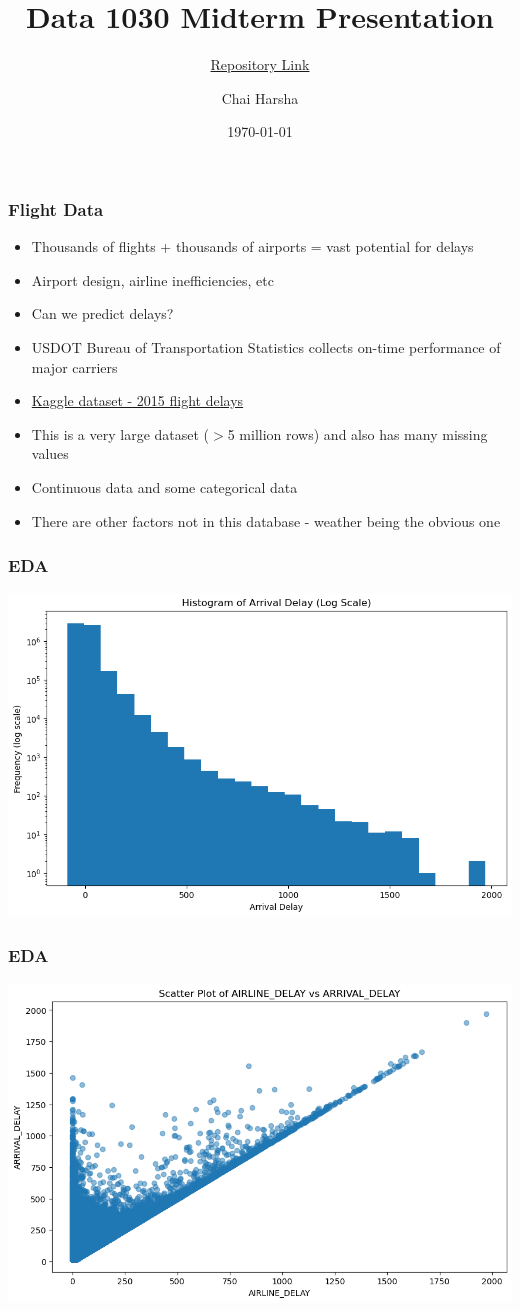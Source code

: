 \documentclass[
    aspectratio = 169,
    ]{beamer}
\title{Data 1030 Midterm Presentation}
\subtitle{\href{https://github.com/Equite774/data1030-final-project-Equite774}{Repository Link}}
\author{Chai Harsha}
\institute{Brown University}
\date{\today}
\begin{document}
\begin{frame}
    \titlepage
\end{frame}

\begin{frame}
    \frametitle{Flight Data}
    \begin{itemize}
        \item Thousands of flights + thousands of airports = vast potential for delays
        \item Airport design, airline inefficiencies, etc
        \item Can we predict delays?
        \item USDOT Bureau of Transportation Statistics collects on-time performance of major carriers
        \item \href{https://www.kaggle.com/datasets/usdot/flight-delays/data?select=flights.csv}{\color{blue}Kaggle dataset - 2015 flight delays\color{black}}
        \item This is a very large dataset (\(>\)5 million rows) and also has many missing values
        \item Continuous data and some categorical data
        \item There are other factors not in this database - weather being the obvious one
    \end{itemize}
\end{frame}

\begin{frame}
    \frametitle{EDA}
    \begin{center}
        \includegraphics[width=0.7\linewidth]{visualizations/arrivaldelay.png}
    \end{center}
\end{frame}

\begin{frame}
    \frametitle{EDA}
    \begin{center}
        \includegraphics[width=0.7\linewidth]{visualizations/arrivaldelayvsairlinedelay.png}
    \end{center}
\end{frame}
\end{document}
